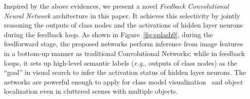 Inspired by the above evidences, we present a novel \emph{Feedback Convolutional Neural Network} architecture in this paper. It achieves this selectivity by jointly reasoning the outputs of class nodes and the activations of hidden layer neurons during the feedback loop. As shown in Figure~\ref{fig:splash0}, during the feedforward stage, the proposed networks perform inference from image features in a bottom-up manner as traditional Convolutional Networks; while in feedback loops, it sets up high-level semantic labels (\emph{e.g.}, outputs of class nodes) as the ``goal'' in visual search to infer the activation status of hidden layer neurons. The networks are powerful enough to apply for class model visualization~\cite{simonyan2013deep, zeiler2014visualizing} and object localization even in cluttered scenes with multiple objects.

